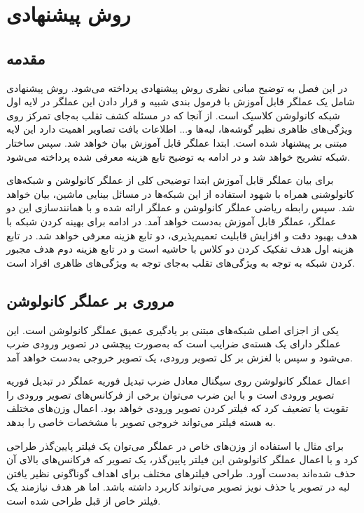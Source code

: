 
\chapter{روش پیشنهادی}
\section{مقدمه} 
در این فصل به توضیح مبانی نظری روش پیشنهادی پرداخته می‌شود. روش پیشنهادی شامل یک عملگر قابل آموزش با فرمول بندی شبیه  و قرار دادن این عملگر در لایه اول شبکه کانولوشن کلاسیک است. از آنجا که در مسئله کشف تقلب به‌جای تمرکز روی ویژگی‌های ظاهری نظیر گوشه‌ها، لبه‌ها و... اطلاعات بافت تصاویر اهمیت دارد این لایه مبتنی بر  پیشنهاد شده است. 
ابتدا عملگر  قابل آموزش بیان خواهد شد. سپس ساختار شبکه تشریح خواهد شد و در ادامه به توضیح تابع هزینه معرفی شده پرداخته می‌شود. 

برای بیان عملگر  قابل آموزش ابتدا توضیحی کلی از عملگر کانولوشن و شبکه‌های کانولوشنی همراه با شهود استفاده از این شبکه‌ها در مسائل بینایی ماشین، بیان خواهد شد. سپس رابطه ریاضی عملگر کانولوشن و عملگر  ارائه شده و با همانندسازی این دو عملگر، عملگر  قابل آموزش به‌دست خواهد آمد.
در ادامه برای بهینه کردن شبکه با هدف بهبود دقت و افزایش قابلیت تعمیم‌پذیری، دو تابع هزینه معرفی خواهد شد. در تابع هزینه اول هدف تفکیک کردن دو کلاس با حاشیه است و در تابع هزینه دوم هدف مجبور کردن شبکه به توجه به ویژگی‌های تقلب به‌جای توجه به ویژگی‌های ظاهری افراد است.
\section{مروری بر عملگر کانولوشن}
یکی از اجزای اصلی شبکه‌های مبتنی بر یادگیری عمیق عملگر کانولوشن است. این عملگر دارای یک هسته‌ی ضرایب است که به‌صورت پیچشی در تصویر ورودی ضرب می‌شود و سپس با لغزش بر کل تصویر ورودی، یک تصویر خروجی به‌دست خواهد آمد. 

اعمال عملگر کانولوشن روی سیگنال معادل ضرب تبدیل فوریه عملگر در تبدیل فوریه تصویر ورودی است و با این ضرب می‌توان برخی از فرکانس‌های تصویر ورودی را تقویت یا تضعیف کرد که فیلتر کردن تصویر ورودی خواهد بود. اعمال وزن‌های مختلف به هسته فیلتر می‌تواند خروجی تصویر با مشخصات خاصی را بدهد.

برای مثال با استفاده از وزن‌های خاص در عملگر می‌توان یک فیلتر پایین‌گذر طراحی کرد و با اعمال عملگر کانولوشن این فیلتر پایین‌گذر، یک تصویر که فرکانس‌های بالای آن حذف شده‌اند به‌دست آورد. طراحی فیلترهای مختلف برای اهداف گوناگونی نظیر یافتن لبه در تصویر یا حذف نویز تصویر می‌تواند کاربرد داشته باشد. اما هر هدف نیازمند یک فیلتر خاص از قبل طراحی شده است. 

